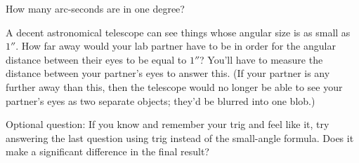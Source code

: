 How many arc-seconds are in one degree?

\vskip 1in

A decent astronomical telescope can see things whose angular size is
as small as $1''$.  How far away would your lab partner have to be in
order for the angular distance between their eyes to be equal to
$1''$?  You'll have to measure the distance between your partner's
eyes to answer this.  (If your partner is any further away than this,
then the telescope would no longer be able to see your partner's eyes
as two separate objects; they'd be blurred into one blob.)


\vskip 1in

Optional question:
If you know and remember your trig and feel like it, try answering
the last question using trig instead of the small-angle formula.  Does
it make a significant difference in the final result?


